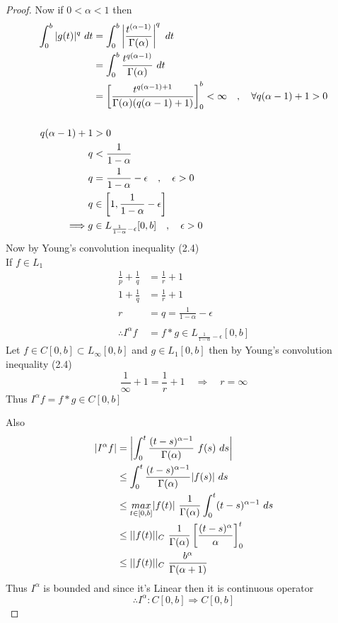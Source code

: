 \begin{proof}[Proof]
Now if $0<\alpha<1$ then 
\begin{align*}
    \int_{0}^{b}|g(t)|^q \,\, dt &= \int_{0}^{b}\left|\frac{t^{(\alpha-1)}}{\Gamma(\alpha)}\right|^q \,\, dt
    \\
    &= \int_{0}^{b}\frac{t^{q(\alpha-1)}}{\Gamma(\alpha)} \,\, dt
    \\
    &= \left[\frac{t^{q(\alpha-1)+1}}{\Gamma(\alpha)(q(\alpha-1)+1)}\right]_0^b < \infty \quad , \quad \forall q(\alpha-1)+1>0
\\\\
    q(\alpha-1)+1 &> 0
    \\
    q &< \frac{1}{1-\alpha}
    \\
    q &= \frac{1}{1-\alpha}-\epsilon \quad , \quad \epsilon>0
    \\
    q &\in \left[1,\frac{1}{1-\alpha}-\epsilon\right]
    \\
    \Longrightarrow g &\in L_{\frac{1}{1-\alpha}-\epsilon}[0,b] \quad , \quad \epsilon>0
\end{align*}
Now by Young's convolution inequality (2.4)
\\
If $f \in L_1$
\begin{align*}
    \frac{1}{p} + \frac{1}{q} &= \frac{1}{r} + 1
    \\
    1 + \frac{1}{q} &= \frac{1}{r} + 1
    \\
    r &= q = \frac{1}{1-\alpha}-\epsilon
    \\\\
    \therefore I^\alpha f &= f*g \in L_{\frac{1}{1-\alpha}-\epsilon}[0,b]
\end{align*}
 Let $f \in C[0,b] \subset L_\infty[0,b]$ and $g \in L_1[0,b]$ then by Young's convolution inequality (2.4)
\[
    \frac{1}{\infty} + 1 = \frac{1}{r} + 1 \quad\Longrightarrow\quad r=\infty
\]
Thus $I^\alpha f = f*g \in C[0,b]$

Also 
\begin{align*}
    |I^\alpha f| &= \left|  \int_{0}^{t} \frac{(t-s)^{\alpha-1}}{\Gamma(\alpha)} \,\, f(s) \,\, ds \right|
    \\
    &\leq \int_{0}^{t} \frac{(t-s)^{\alpha-1}}{\Gamma(\alpha)}|f(s)| \,\, ds
    \\
    &\leq \underset{t\in[0,b]}{max}|f(t)| \,\, \frac{1}{\Gamma(\alpha)}\int_{0}^{t} (t-s)^{\alpha-1} \,\, ds
    \\
    &\leq ||f(t)||_C \,\, \frac{1}{\Gamma(\alpha)} \left[\frac{(t-s)^{\alpha}}{\alpha}\right]_{0}^{t}
    \\
    &\leq ||f(t)||_C  \,\, \frac{b^{\alpha}}{\Gamma(\alpha+1)} 
\end{align*}
Thus $I^\alpha$ is bounded and since it's Linear then it is continuous operator
\[
\therefore  I^\alpha : C[0,b] \Longrightarrow C[0,b]   
\]
\end{proof}
